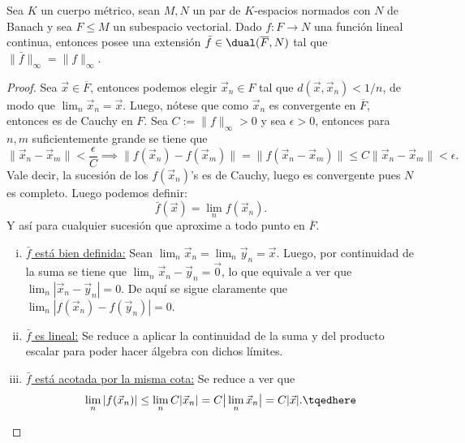 \documentclass[topologia-analisis.tex]{subfiles}
\begin{document}
\begin{thm}
	Sea $K$ un cuerpo métrico, sean $M, N$ un par de $K$-espacios normados con $N$ de Banach y sea $F \le M$ un subespacio vectorial.
	Dado $f \colon F \to N$ una función lineal continua, entonces posee una extensión $\bar f \in \dual(\overline F, N)$
	tal que $\| \bar f \|_\infty = \| f \|_\infty$.
\end{thm}
\begin{proof}
	Sea $\vec x \in \overline F$, entonces podemos elegir $\vec x_n \in F$ tal que $d(\vec x, \vec x_n) < 1/n$, de modo que $\lim_n \vec x_n = \vec x$.
	Luego, nótese que como $\vec x_n$ es convergente en $\overline F$, entonces es de Cauchy en $F$.
	Sea $C := \| f \|_\infty > 0$ y sea $\epsilon > 0$, entonces para $n, m$ suficientemente grande se tiene que
	\[
		\|\vec x_n - \vec x_m\| < \frac\epsilon C \implies \|f(\vec x_n) - f(\vec x_m)\|
		= \|f(\vec x_n - \vec x_m)\| \le C \|\vec x_n - \vec x_m\| < \epsilon.
	\]
	Vale decir, la sucesión de los $f(\vec x_n)$'s es de Cauchy, luego es convergente pues $N$ es completo.
	Luego podemos definir:
	\[
		\bar f(\vec x) = \lim_n f(\vec x_n).
	\]
	Y así para cualquier sucesión que aproxime a todo punto en $\overline F$.
	\begin{enumerate}[i)]
		\item \underline{$\bar f$ está bien definida:}
			Sean $\lim_n \vec x_n = \lim_n \vec y_n = \vec x$.
			Luego, por continuidad de la suma se tiene que $\lim_n \vec x_n - \vec y_n = \Vec 0$,
			lo que equivale a ver que $\lim_n |\vec x_n - \vec y_n| = 0$.
			De aquí se sigue claramente que $\lim_n | f(\vec x_n) - f(\vec y_n) | = 0$.

		\item \underline{$\bar f$ es lineal:}
			Se reduce a aplicar la continuidad de la suma y del producto escalar para poder hacer álgebra con dichos límites.

		\item \underline{$\bar f$ está acotada por la misma cota:}
			Se reduce a ver que
			\begin{equation}
				\lim_n | f(\vec x_n) | \le \lim_n C | \vec x_n | = C\mathopen{}\big\lvert \lim_n \vec x_n \big\rvert\mathclose{}
				= C| \vec x |. \tqedhere
			\end{equation}
	\end{enumerate}
\end{proof}
\thmdep{}
\end{document}
